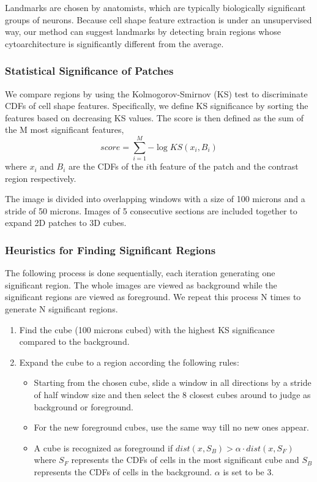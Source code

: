 \documentclass[runningheads]{llncs}
\begin{document}
Landmarks are chosen by anatomists, which are typically biologically significant groups of neurons. Because cell shape feature extraction is under an unsupervised way, our method can suggest landmarks by detecting brain regions whose cytoarchitecture is significantly different from the average.

\subsubsection{Statistical Significance of Patches}

We compare regions by using the Kolmogorov-Smirnov (KS) test to discriminate CDFs of cell shape features. Specifically, we define KS significance by sorting the features based on decreasing KS values. The score is then defined as the sum of the M most significant features,
\begin{equation}
score=\sum_{i=1}^{M}{-\log{KS(x_i, B_i)}}
\end{equation}
where $x_i$ and $B_i$ are the CDFs of the $i$th feature of the patch and the contrast region respectively.

The image is divided into overlapping windows with a size of 100 microns and a stride of 50 microns. Images of 5 consecutive sections are included together to expand 2D patches to 3D cubes. 


\subsubsection{Heuristics for Finding Significant Regions}

The following process is done sequentially, each iteration generating one significant region. The whole images are viewed as background while the significant regions are viewed as foreground. We repeat this process N times to generate N significant regions.
\begin{enumerate}
  \item Find the cube (100 microns cubed) with the highest KS significance compared to the background.
  \item Expand the cube to a region according the following rules:
  		\begin{itemize}
 			 \item Starting from the chosen cube, slide a window in all directions by a stride of half window size and then select the 8 closest cubes around to judge as background or foreground.
  			 \item For the new foreground cubes, use the same way till no new ones appear.
 			 \item A cube is recognized as foreground if $dist(x,S_B )>\alpha \cdot dist(x,S_F)$ where $S_F$ represents the CDFs of cells in the most significant cube and $S_B$ represents the CDFs of cells in the background. $\alpha$ is set to be 3.
		\end{itemize}
\end{enumerate}
\end{document}
